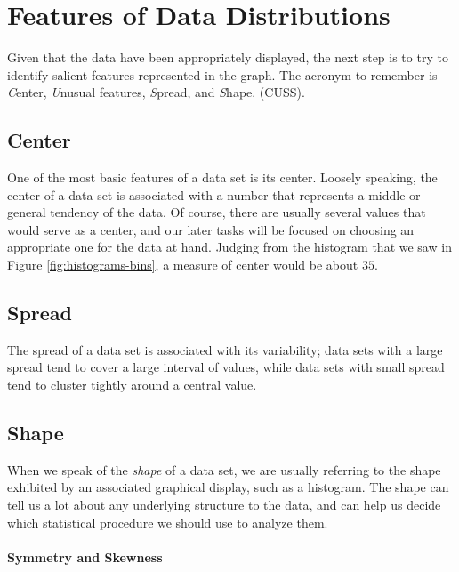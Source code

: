\documentclass[captions=tableheading]{scrbook}
\begin{document}
\label{sub:other-data-types}
\section{Features of Data Distributions}
\label{sec-3-2}

\label{sec:features-of-data}

Given that the data have been appropriately displayed, the next step is to try to identify salient features represented in the graph. The acronym to remember is \emph{C}enter, \emph{U}nusual features, \emph{S}pread, and \emph{S}hape. (CUSS).
\subsection{Center}
\label{sec-3-2-1}

\label{sub:Center}

One of the most basic features of a data set is its center. Loosely speaking, the center of a data set is associated with a number that represents a middle or general tendency of the data. Of course, there are usually several values that would serve as a center, and our later tasks will be focused on choosing an appropriate one for the data at hand. Judging from the histogram that we saw in Figure \ref{fig:histograms-bins}, a measure of center would be about \(  35 \). 
\subsection{Spread}
\label{sec-3-2-2}

\label{sub:Spread}

The spread of a data set is associated with its variability; data sets with a large spread tend to cover a large interval of values, while data sets with small spread tend to cluster tightly around a central value. 
\subsection{Shape}
\label{sec-3-2-3}

\label{sub:Shape}

When we speak of the \emph{shape} of a data set, we are usually referring to the shape exhibited by an associated graphical display, such as a histogram. The shape can tell us a lot about any underlying structure to the data, and can help us decide which statistical procedure we should use to analyze them.

\paragraph*{Symmetry and Skewness}
\end{document}
